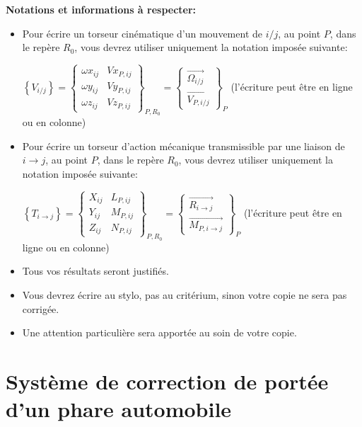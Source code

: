 

\textbf{Notations et informations à respecter:}

\begin{itemize}
 \item Pour écrire un torseur cinématique d'un mouvement de $i/j$, au point $P$, dans le repère $R_0$, vous devrez utiliser uniquement la notation imposée suivante: 

$\left\{V_{i/j}\right\}=\left\{
\begin{matrix}
 \omega x_{ij} & Vx_{P,ij} \\
 \omega y_{ij} & Vy_{P,ij} \\
 \omega z_{ij} & Vz_{P,ij} 
\end{matrix}
\right \}_{P,R_0}=\left \{
\begin{matrix}
 \overrightarrow{\Omega_{i/j}} \\ 
 \overrightarrow{V_{P,i/j}} 
\end{matrix}
\right\}_P$
(l'écriture peut être en ligne ou en colonne)

 \item Pour écrire un torseur d'action mécanique transmissible par une liaison de $i\rightarrow j$, au point $P$, dans le repère $R_0$, vous devrez utiliser uniquement la notation imposée suivante: 

$\left\{T_{i\rightarrow j}\right\}=\left\{
\begin{matrix}
 X_{ij} & {L }_{P,ij} \\
 Y_{ij} & {M }_{P,ij} \\
 Z_{ij} & {N }_{P,ij} 
\end{matrix}
\right \}_{P,R_0}=\left \{
\begin{matrix}
 \overrightarrow{R_{i\rightarrow j}} \\ 
 \overrightarrow{M_{P,i\rightarrow j}} 
\end{matrix}
\right\}_P$
(l'écriture peut être en ligne ou en colonne)

 \item Tous vos résultats seront justifiés.
 \item Vous devrez écrire au stylo, pas au critérium, sinon votre copie ne sera pas corrigée.
 \item Une attention particulière sera apportée au soin de votre copie.
\end{itemize}

\newpage

\section{Système de correction de portée d'un phare automobile}


